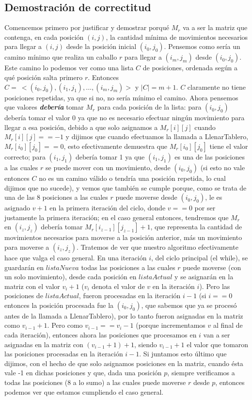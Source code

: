 \documentclass[a4paper]{article}
\begin{document}
\subsection{Demostración de correctitud}
Comencemos primero por justificar y demostrar porqué $M_r$ va a ser la matriz que contenga, en cada posición $(i, j)$, la cantidad mínima de movimientos necesarios para llegar a $(i, j)$ desde la posición inicial $(i_0, j_0)$.
Pensemos como sería un camino mínimo que realiza un caballo $r$ para llegar a $(i_m, j_m)$ desde $(i_0, j_0)$. Este camino lo podemos ver como una lista $C$ de posiciones, ordenada según a qué posición salta primero $r$. Entonces $C = \ <(i_0, j_0), (i_1, j_1), ... , (i_m, j_m)>$ y $|C| = m + 1$. $C$ claramente no tiene posiciones repetidas, ya que si no, no sería mínimo el camino. Ahora pensemos que valores \textit{\textbf{debería}} tomar $M_r$ para cada posición de la lista: para $(i_0, j_0)$ debería tomar el valor 0 ya que no es necesario efectuar ningún movimiento para llegar a esa posición, debido a que solo asignamos a $M_r[i][j]$ cuando $M_r[i][j] == -1$ y dijimos que cuando efectuamos la llamada a LlenarTablero, $M_r[i_0][j_0] == 0$, esto efectivamente demuestra que $M_r[i_0][j_0]$ tiene el valor correcto; para $(i_1, j_1)$ debería tomar 1 ya que $(i_1, j_1)$ es una de las posiciones a las cuales $r$ se puede mover con un movimiento, desde $(i_0, j_0)$ (si esto no vale entonces $C$ no es un camino válido o tendría una posición repetida, lo cual dijimos que no sucede), y vemos que también se cumple porque, como se trata de una de las 8 posiciones a las cuales $r$ puede moverse desde $(i_0, j_0)$, le es asignado $v + 1$ en la primera iteración del ciclo, donde $v == 0$ por ser justamente la primera iteración; en el caso general entonces, tendremos que $M_r$ en $(i_z, j_z)$ debería tomar $M_r[i_{z-1}][j_{z-1}] + 1$, que representa la cantidad de movimientos necesarios para moverse a la posición anterior, más un movimiento para moverse a $(i_z, j_z)$. Tratemos de ver que nuestro algoritmo efectivamente hace que valga el caso general. En una iteración $i$, del ciclo principal (el while), se guardarán en $listaNueva$ todas las posiciones a las cuales $r$ puede moverse (con un solo movimiento), desde cada posición en $listaActual$ y se asignarán en la matriz con el valor $v_i + 1$ ($v_i$ denota el valor de $v$ en la iteración $i$). Pero las posiciones de $listaActual$, fueron procesadas en la iteración $i - 1$ (si $i == 0$ entonces la posición procesada fue la $(i_0, j_0)$, que sabemos que ya se procesó antes de la llamada a LlenarTablero), por lo tanto fueron asignadas en la matriz como $v_{i - 1} + 1$. Pero como $v_{i - 1} == v_i - 1$ (porque incrementamos $v$ al final de cada iteración), entonces ahora las posiciones que procesamos en $i$ van a ser asignadas en la matriz con $(v_{i - 1} + 1) + 1$, siendo $v_{i - 1} + 1$ el valor que tomaron las posiciones procesadas en la iteración $i - 1$. Si juntamos esto último que dijimos, con el hecho de que solo asignamos posiciones en la matriz, cuando ésta vale -1 en dichas posiciones y que, dada una posición $p$, siempre verificamos a todas las posiciones (8 a lo sumo) a las cuales puede moverse $r$ desde $p$, entonces podemos ver que estamos cumpliendo el caso general.
\end{document}
